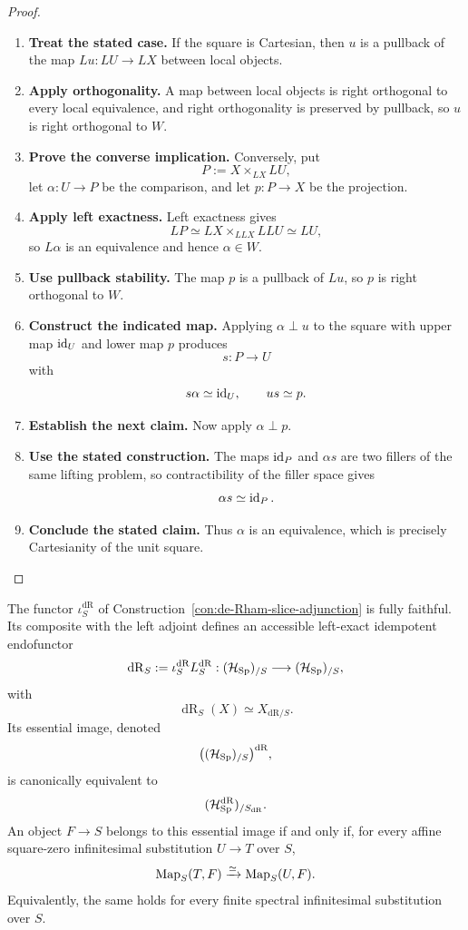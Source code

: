 \begin{proof}
\leavevmode
\begin{enumerate}[label=\textup{(\arabic*)}]
    \item \textbf{Treat the stated case.}
    If the square is Cartesian, then \(u\) is a pullback of the map
    \(Lu:LU\to LX\) between local objects.
    \item \textbf{Apply orthogonality.}
    A map between local objects is right
    orthogonal to every local equivalence, and right orthogonality is preserved by
    pullback, so \(u\) is right orthogonal to \(W\).
    \item \textbf{Prove the converse implication.}
    Conversely, put
    \[
    P:=X\times_{LX}LU,
    \]
    let \(\alpha:U\to P\) be the comparison, and let \(p:P\to X\) be the
    projection.
    \item \textbf{Apply left exactness.}
    Left exactness gives
    \[
    LP
    \simeq
    LX\times_{LLX}LLU
    \simeq
    LU,
    \]
    so \(L\alpha\) is an equivalence and hence \(\alpha\in W\).
    \item \textbf{Use pullback stability.}
    The map \(p\)
    is a pullback of \(Lu\), so \(p\) is right orthogonal to \(W\).
    \item \textbf{Construct the indicated map.}
    Applying
    \(\alpha\perp u\) to the square with upper map \(\operatorname{id}_U\) and lower map \(p\)
    produces
    \[
    s:P\longrightarrow U
    \]
    with
    \[
    s\alpha\simeq\operatorname{id}_U,
    \qquad
    us\simeq p.
    \]
    \item \textbf{Establish the next claim.}
    Now apply \(\alpha\perp p\).
    \item \textbf{Use the stated construction.}
    The maps \(\operatorname{id}_P\) and \(\alpha s\) are two
    fillers of the same lifting problem, so contractibility of the filler space gives
    \[
    \alpha s\simeq\operatorname{id}_P.
    \]
    \item \textbf{Conclude the stated claim.}
    Thus \(\alpha\) is an equivalence, which is precisely Cartesianity of the unit
    square.
\end{enumerate}
\end{proof}

\begin{theorem}
\label{thm:slice-de-Rham}
The functor \(\iota^{\mathrm{dR}}_S\) of Construction~\ref{con:de-Rham-slice-adjunction} is fully
faithful. Its composite with the left adjoint defines an accessible left-exact
idempotent endofunctor
\[
  \operatorname{dR}_S
  :=\iota^{\mathrm{dR}}_SL^{\mathrm{dR}}_S:
  (\mathcal H_{\operatorname{Sp}})_{/S}
  \longrightarrow
  (\mathcal H_{\operatorname{Sp}})_{/S},
\]
with
\[
  \operatorname{dR}_S(X)
  \simeq
  X_{\mathrm{dR}/S}.
\]
Its essential image, denoted
\[
  \bigl((\mathcal H_{\operatorname{Sp}})_{/S}\bigr)^{\mathrm{dR}},
\]
is canonically equivalent to
\[
  (\mathcal H_{\operatorname{Sp}}^{\mathrm{dR}})_{/S_{\mathrm{dR}}}.
\]
An object \(F\to S\) belongs to this essential image if and only if, for every
affine square-zero infinitesimal substitution \(U\to T\) over \(S\),
\[
  \operatorname{Map}_S(T,F)\xrightarrow{\simeq}\operatorname{Map}_S(U,F).
\]
Equivalently, the same holds for every finite spectral infinitesimal substitution over \(S\).
\end{theorem}

